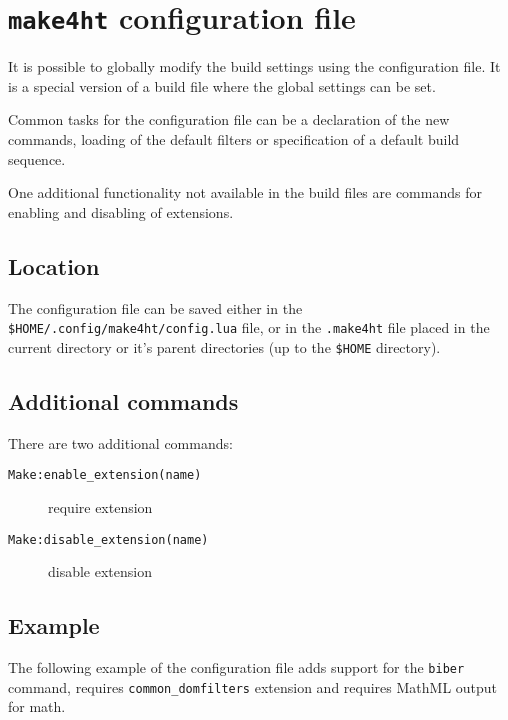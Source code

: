 \hypertarget{configfile}{%
\section{\texorpdfstring{\texttt{make4ht} configuration
file}{make4ht configuration file}}\label{configfile}}

It is possible to globally modify the build settings using the
configuration file. It is a special version of a build file where the
global settings can be set.

Common tasks for the configuration file can be a declaration of the new
commands, loading of the default filters or specification of a default
build sequence.

One additional functionality not available in the build files are
commands for enabling and disabling of extensions.

\hypertarget{location}{%
\subsection{Location}\label{location}}

The configuration file can be saved either in the
\texttt{\$HOME/.config/make4ht/config.lua} file, or in the
\texttt{.make4ht} file placed in the current directory or it's parent
directories (up to the \texttt{\$HOME} directory).

\hypertarget{additional-commands}{%
\subsection{Additional commands}\label{additional-commands}}

There are two additional commands:

\begin{description}
\item[\texttt{Make:enable\_extension(name)}]
require extension
\item[\texttt{Make:disable\_extension(name)}]
disable extension
\end{description}

\hypertarget{example}{%
\subsection{Example}\label{example}}

The following example of the configuration file adds support for the
\texttt{biber} command, requires \texttt{common\_domfilters} extension
and requires MathML output for math.

